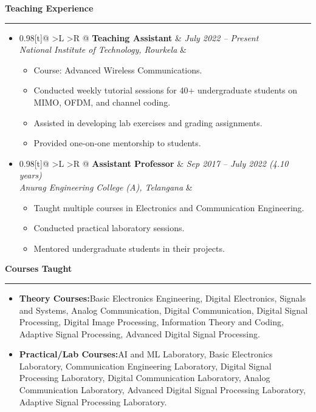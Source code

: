 \documentclass[a4paper,11pt]{article}
\makeatletter
\renewcommand{\section}[1]{%
  \vspace{8pt}%
  {\large\scshape\raggedright #1}%
  \vspace{3pt}\hrule\vspace{4pt}%
}
\newcommand{\resumeItem}[2]{
  \item{
    \textbf{#1}{\hspace{0.5mm}#2 \vspace{-0.5mm}}
  }
}
\newcommand{\resumeSubheading}[4]{
\vspace{0.5mm}\item
    \begin{tabularx}{0.98\textwidth}[t]{@{} >{\hsize=1.5\hsize}L >{\hsize=0.5\hsize}R @{}}
        \textbf{#1} & \textit{\footnotesize{#4}} \\
        \textit{\footnotesize{#3}} &  \footnotesize{#2}\\
    \end{tabularx}
    \vspace{-2.4mm}
}
\newcommand{\resumeSubHeadingListStart}{\begin{itemize}[leftmargin=*,label={},topsep=0pt,partopsep=0pt,itemsep=6pt,parsep=0pt]}
\newcommand{\resumeItemListStart}{\begin{justify}\begin{itemize}[leftmargin=3ex, rightmargin=2ex, noitemsep,labelsep=1.2mm,itemsep=0mm]\small}
\newcommand{\resumeSubHeadingListEnd}{\end{itemize}\vspace{1mm}}
\newcommand{\resumeItemListEnd}{\end{itemize}\end{justify}\vspace{-2mm}}
\makeatother
\begin{document}
\section{\textbf{Teaching Experience}}
  \resumeSubHeadingListStart
    \resumeSubheading
      {Teaching Assistant}{}
      {National Institute of Technology, Rourkela}{July 2022 -- Present}
      \resumeItemListStart
        \item {Course: Advanced Wireless Communications.}
        \item {Conducted weekly tutorial sessions for 40+ undergraduate students on MIMO, OFDM, and channel coding.}
        \item {Assisted in developing lab exercises and grading assignments.}
        \item {Provided one-on-one mentorship to students.}
      \resumeItemListEnd
    \resumeSubheading
      {Assistant Professor}{}
      {Anurag Engineering College (A), Telangana}{Sep 2017 -- July 2022 (4.10 years)}
      \resumeItemListStart
        \item {Taught multiple courses in Electronics and Communication Engineering.}
        \item {Conducted practical laboratory sessions.}
        \item {Mentored undergraduate students in their projects.}
      \resumeItemListEnd
  \resumeSubHeadingListEnd

\section{\textbf{Courses Taught}}
\begin{itemize}[leftmargin=*,labelsep=1.5mm,topsep=0pt,partopsep=0pt,itemsep=4pt,parsep=0pt]
  \resumeItem{Theory Courses:}{Basic Electronics Engineering, Digital Electronics, Signals and Systems, Analog Communication, Digital Communication, Digital Signal Processing, Digital Image Processing, Information Theory and Coding, Adaptive Signal Processing, Advanced Digital Signal Processing.}
  \resumeItem{Practical/Lab Courses:}{AI and ML Laboratory, Basic Electronics Laboratory, Communication Engineering Laboratory, Digital Signal Processing Laboratory, Digital Communication Laboratory, Analog Communication Laboratory, Advanced Digital Signal Processing Laboratory, Adaptive Signal Processing Laboratory.}
\end{itemize}

\end{document}
